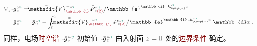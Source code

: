 \begin{subequations} \label{eq:simplify6-LE0-SVA-V_1nonsingular}
\begin{align}
	\mathcolor{gray}{\nabla_z} \Xint{{}^{}_{\mathcolor{gray}{-}}}{10}{\bar{g}}^{\;\!\mathcolor{gray}{\omega} \textcolor{PineGreen}{\imath}}_{\;\! \mathcolor{gray}{z}}
	&= - \Xint{\mathcolor{gray}{-}}{25}{\bar{\bar{\mathsfit{V}}}}^{\;\! - \mathcolor{gray}{\omega} \textcolor{PineGreen}{\imath}}_{\textcolor{Maroon}{\mathbb{1}}} \Xint{\mathcolor{gray}{-}}{30}{\bar{P}}^{\;\! \mathcolor{gray}{\omega} \textcolor{PineGreen}{\imath}}_{\;\! \mathcolor{gray}{z} \textcolor{Maroon}{(2)}} \big/ \mathbb{e}^{\mathbb{i} \Xint{\begin{smallmatrix} ~ \\ {}^{}_{\mathcolor{gray}{-}} \\ ~ \end{smallmatrix}}{15}{k}_{\symup{z}}^{\;\! \mathcolor{gray}{\omega} \textcolor{PineGreen}{\imath}} \mathcolor{gray}{z}} \label{eq:simplify6-LE0-SVA-V_1nonsingular-g} \\
	\Xint{{}^{}_{\mathcolor{gray}{-}}}{10}{\bar{g}}^{\;\!\mathcolor{gray}{\omega} \textcolor{PineGreen}{\imath}}_{\;\! \mathcolor{gray}{z}}
	&= \Xint{{}^{}_{\mathcolor{gray}{-}}}{10}{\bar{g}}^{\;\!\mathcolor{gray}{\omega} \textcolor{PineGreen}{\imath}}_{\;\! \mathcolor{gray}{0}} - \int_{\mathcolor{gray}{0}}^{\mathcolor{gray}{z}} \Xint{\mathcolor{gray}{-}}{25}{\bar{\bar{\mathsfit{V}}}}^{\;\! - \mathcolor{gray}{\omega} \textcolor{PineGreen}{\imath}}_{\textcolor{Maroon}{\mathbb{1}}} \Xint{\mathcolor{gray}{-}}{30}{\bar{P}}^{\;\! \mathcolor{gray}{\omega} \textcolor{PineGreen}{\imath}}_{\;\! \mathcolor{gray}{\mathtt{z}} \textcolor{Maroon}{(2)}} \big/ \mathbb{e}^{\mathbb{i} \Xint{\begin{smallmatrix} ~ \\ {}^{}_{\mathcolor{gray}{-}} \\ ~ \end{smallmatrix}}{15}{k}_{\symup{z}}^{\;\! \mathcolor{gray}{\omega} \textcolor{PineGreen}{\imath}} \mathcolor{gray}{\mathtt{z}}} ~\mathbb{d} \mathcolor{gray}{\mathtt{z}} ~. \label{eq:simplify6-LE0-SVA-V_1nonsingular-solution-g}
\end{align}
\end{subequations}
同样，电场\textcolor{Maroon}{时空谱} $\Xint{{}^{}_{\mathcolor{gray}{-}}}{10}{\bar{g}}^{\;\!\mathcolor{gray}{\omega} \textcolor{PineGreen}{\jmath}}_{\;\! \mathcolor{gray}{z}}$ 初始值 $\Xint{{}^{}_{\mathcolor{gray}{-}}}{10}{\bar{g}}^{\;\!\mathcolor{gray}{\omega} \textcolor{PineGreen}{\imath}}_{\;\! \mathcolor{gray}{0}}$ 由入射面 $\mathcolor{gray}{z \mathcolor{black}{=} 0}$ 处的\textcolor{Maroon}{边界条件}  确定。

